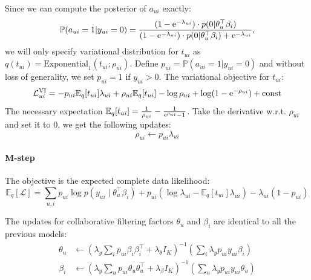 Since we can compute the posterior of $a_{ui}$ exactly:
\begin{equation}
\mathbb{P}(a_{ui} = 1 | y_{ui} = 0) = \frac{(1 - \mathrm{e}^{-\lambda_{ui}}) \cdot p(0 | \theta_u^\top\beta_i)}{(1 - \mathrm{e}^{-\lambda_{ui}})\cdot p(0 |  \theta_u^\top\beta_i) + \mathrm{e}^{-\lambda_{ui}}},
\end{equation}
we will only specify variational distribution for $t_{ui}$ as $q(t_{ui}) = \text{Exponential}_1(t_{ui}; \rho_{ui})$. Define $p_{ui} = \mathbb{P}(a_{ui} = 1 | y_{ui} = 0)$ and without loss of generality, we set $p_{ui} = 1$ if $y_{ui} > 0$. The variational objective for $t_{ui}$:
\[
\mathcal{L}^\text{VI}_{ui} = -p_{ui}\mathbb{E}_q[t_{ui}] \lambda_{ui} + \rho_{ui} \mathbb{E}_q[t_{ui}] - \log\rho_{ui} + \log(1 - \mathrm{e}^{-\rho_{ui}}) + \text{const}
\]
The necessary expectation $\mathbb{E}_q[t_{ui}] = \frac{1}{\rho_{ui}} - \frac{1}{\mathrm{e}^{\rho_{ui}} - 1}$. Take the derivative w.r.t. $\rho_{ui}$ and set it to $0$, we get the following updates:
\[
\rho_{ui} \leftarrow p_{ui}\lambda_{ui}
\]
\paragraph{M-step}  The objective is the expected complete data likelihood:
\begin{equation}
\mathbb{E}_q[\mathcal{L}] = \sum_{u, i} p_{ui} \log p(y_{ui} \mid \theta_u^\top\beta_i) + p_{ui} (\log\lambda_{ui}- \mathbb{E}_q[t_{ui}] \lambda_{ui}) - \lambda_{ui}(1 - p_{ui})
\end{equation}

The updates for collaborative filtering factors $\theta_u$ and $\beta_i$ are identical to all the previous models:
\begin{align}
\theta_u &\leftarrow \textstyle(\lambda_y \sum_i p_{ui} \beta_i \beta_i^\top +  \lambda_\theta I_K)^{-1} (\sum_i \lambda_y p_{ui} y_{ui} \beta_i ) \\
\beta_i &\leftarrow \textstyle(\lambda_y \sum_u p_{ui} \theta_u \theta_u^\top + \lambda_\beta I_K)^{-1} (\sum_u \lambda_y p_{ui} {y}_{ui} \theta_u)
\end{align}


